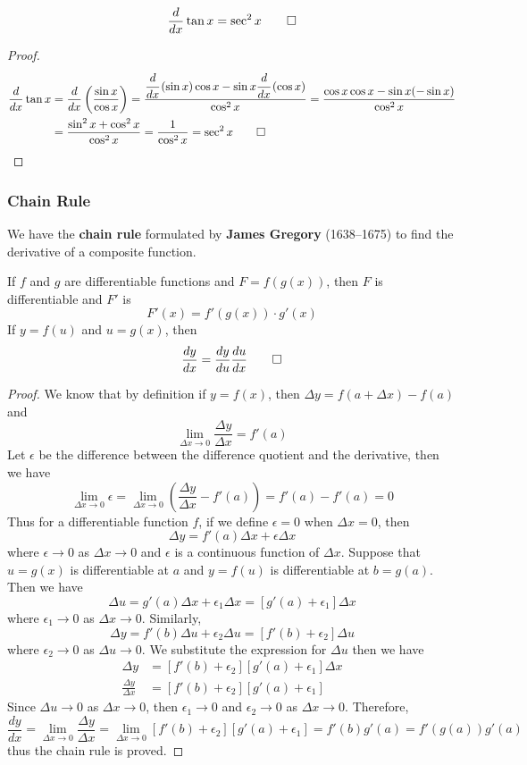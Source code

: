 \begin{theorem}
    \[\frac{d}{dx}\tan x=\sec^2 x\qedhere\]
\end{theorem}
\begin{proof}
    \begin{align*}
        \frac{d}{dx}\tan x&= \frac{d}{dx}\left(\frac{\sin x}{\cos x}\right)
        =\frac{\cfrac{d}{dx}\left(\sin x\right)\cos x
        -\sin x\cfrac{d}{dx}\left(\cos x\right)}{\cos^2 x}
        =\frac{\cos x\cos x-\sin x(-\sin x)}{\cos^2 x}  \\
        &= \frac{\sin^2 x+\cos^2 x}{\cos^2 x}=\frac{1}{\cos^2 x}
        =\sec^2 x\qedhere
    \end{align*}
\end{proof}

\subsubsection{Chain Rule}
We have the \textbf{chain rule} formulated by \textbf{James Gregory}
(1638--1675) to find the derivative of a composite function.
\begin{theorem}
    If \(f\) and \(g\) are differentiable functions and \(F=f(g(x))\),
    then \(F\) is differentiable and \(F'\) is
    \[F'(x)=f'(g(x))\cdot g'(x)\]
    If \(y=f(u)\) and \(u=g(x)\), then
    \[\frac{dy}{dx}=\frac{dy}{du}\frac{du}{dx}\qedhere\]
\end{theorem}
\begin{proof}
    We know that by definition if \(y=f(x)\),
    then \(\Delta y=f(a+\Delta x)-f(a)\) and
    \[\lim_{\Delta x\to 0}\frac{\Delta y}{\Delta x}=f'(a)\]
    Let \(\epsilon\) be the difference between the difference quotient and the
    derivative, then we have
    \[\lim_{\Delta x\to 0}\epsilon
    =\lim_{\Delta x\to 0}\left(\frac{\Delta y}{\Delta x}-f'(a)\right)
    =f'(a)-f'(a)=0\]
    Thus for a differentiable function \(f\), if we define \(\epsilon=0\)
    when \(\Delta x=0\), then \[\Delta y=f'(a)\Delta x+\epsilon\Delta x\]
    where \(\epsilon\to 0\) as \(\Delta x\to 0\) and \(\epsilon\) is a
    continuous function of \(\Delta x\).
    Suppose that \(u=g(x)\) is differentiable at \(a\) and \(y=f(u)\) is
    differentiable at \(b=g(a)\).
    Then we have
    \[\Delta u=g'(a)\Delta x+\epsilon_1\Delta x=[g'(a)+\epsilon_1]\Delta x\]
    where \(\epsilon_1\to 0\) as \(\Delta x\to 0\).
    Similarly, \[\Delta y=f'(b)\Delta u+\epsilon_2\Delta u=[f'(b)+\epsilon_2]\Delta u\]
    where \(\epsilon_2\to 0\) as \(\Delta u\to 0\).
    We substitute the expression for \(\Delta u\) then we have
    \begin{align*}
        \Delta y &= [f'(b)+\epsilon_2][g'(a)+\epsilon_1]\Delta x \\
        \frac{\Delta y}{\Delta x} &= [f'(b)+\epsilon_2][g'(a)+\epsilon_1]
    \end{align*}
    Since \(\Delta u\to 0\) as \(\Delta x\to 0\), then \(\epsilon_1\to 0\) and
    \(\epsilon_2 \to 0\) as \(\Delta x\to 0\).
    Therefore,
    \[\frac{dy}{dx}=\lim_{\Delta x\to 0}\frac{\Delta y}{\Delta x}
    =\lim_{\Delta x\to 0}[f'(b)+\epsilon_2][g'(a)+\epsilon_1]
    =f'(b)g'(a)=f'(g(a))g'(a)\]
    thus the chain rule is proved.
\end{proof}